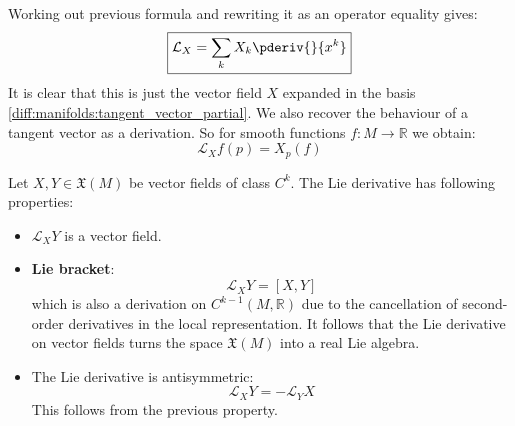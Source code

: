 	\begin{formula}[$\dag$]\label{manifolds:ex:lie_derivative_function}
		Working out previous formula and rewriting it as an operator equality gives:
		\begin{equation}
			\label{manifolds:lie_derivative_function_expansion}
			\boxed{\mathcal{L}_X = \sum_kX_k\pderiv{}{x^k}}
		\end{equation}
		It is clear that this is just the vector field $X$ expanded in the basis \ref{diff:manifolds:tangent_vector_partial}. We also recover the behaviour of a tangent vector as a derivation. So for smooth functions $f:M\rightarrow\mathbb{R}$ we obtain:
		\begin{equation}
			\mathcal{L}_Xf(p) = X_p(f)
		\end{equation}
	\end{formula}
	
	\begin{property}
		Let $X, Y\in\mathfrak{X}(M)$ be vector fields of class $C^k$. The Lie derivative has following properties:
		\begin{itemize}
			\item $\mathcal{L}_XY$ is a vector field.
			\item \textbf{Lie bracket}:
				\begin{equation}
					\label{manifolds:lie_bracket}
					\mathcal{L}_XY = [X, Y]
				\end{equation}
				which is also a derivation on $C^{k-1}(M, \mathbb{R})$ due to the cancellation of second-order derivatives in the local representation. It follows that the Lie derivative on vector fields turns the space $\mathfrak{X}(M)$ into a real Lie algebra.
			\item The Lie derivative is antisymmetric:
				\begin{equation}
					\label{diff:lie_derivative_antisymmetry}
					\mathcal{L}_XY = -\mathcal{L}_YX
				\end{equation}
				This follows from the previous property.
		\end{itemize}
	\end{property}
	

